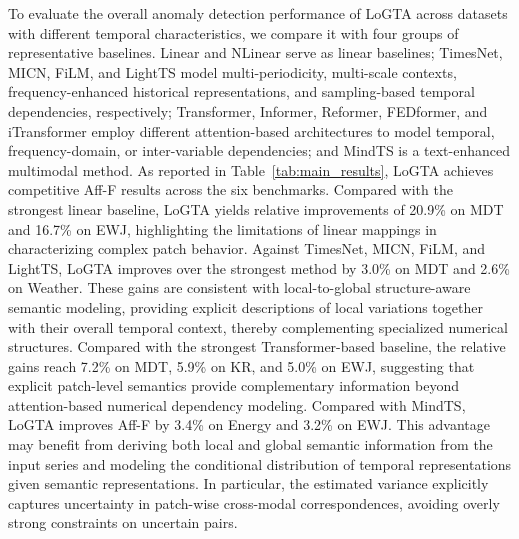 \documentclass[letterpaper]{article} %
\newcommand{\method}{LoGTA}
\begin{document}
\noindent To evaluate the overall anomaly detection performance of \method{}
across datasets with different temporal characteristics, we compare it with
four groups of representative baselines. Linear and NLinear serve as linear
baselines; TimesNet, MICN, FiLM, and LightTS model multi-periodicity,
multi-scale contexts, frequency-enhanced historical representations, and
sampling-based temporal dependencies, respectively; Transformer, Informer,
Reformer, FEDformer, and iTransformer employ different attention-based
architectures to model temporal, frequency-domain, or inter-variable
dependencies; and MindTS is a text-enhanced multimodal method. As reported in
Table~\ref{tab:main_results}, \method{} achieves competitive Aff-F results
across the six benchmarks. Compared with the strongest linear baseline,
\method{} yields relative improvements of 20.9\% on MDT and 16.7\% on EWJ,
highlighting the limitations of linear mappings in characterizing complex
patch behavior. Against TimesNet, MICN, FiLM, and LightTS, \method{} improves
over the strongest method by 3.0\% on MDT and 2.6\% on Weather. These gains
are consistent with local-to-global structure-aware semantic modeling, providing
explicit descriptions of local variations together with their overall
temporal context, thereby complementing specialized numerical structures.
Compared with the strongest Transformer-based baseline, the relative gains
reach 7.2\% on MDT, 5.9\% on KR, and 5.0\% on EWJ, suggesting that explicit
patch-level semantics provide complementary information beyond
attention-based numerical dependency modeling. Compared with MindTS,
\method{} improves Aff-F by 3.4\% on Energy and 3.2\% on EWJ. This advantage
may benefit from deriving both local and global semantic information from the
input series and modeling the conditional distribution of temporal
representations given semantic representations. In particular, the estimated variance explicitly captures uncertainty in patch-wise cross-modal correspondences, avoiding overly strong constraints on uncertain pairs.
\end{document}

